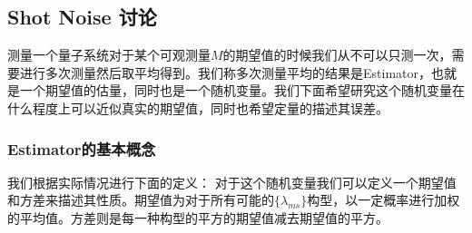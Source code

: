 \subsection{Shot Noise 讨论}
测量一个量子系统对于某个可观测量$ M
$的期望值的时候我们从不可以只测一次，需要进行多次测量然后取平均得到。我们称多次测量平均的结果是Estimator，也就是一个期望值的估量，同时也是一个随机变量。我们下面希望研究这个随机变量在什么程度上可以近似真实的期望值，同时也希望定量的描述其误差。

\subsubsection{Estimator的基本概念}


我们根据实际情况进行下面的定义：
对于这个随机变量我们可以定义一个期望值和方差来描述其性质。期望值为对于所有可能的$ \{\lambda_{m{s}}\}
$构型，以一定概率进行加权的平均值。方差则是每一种构型的平方的期望值减去期望值的平方。

\bigskip
{}

